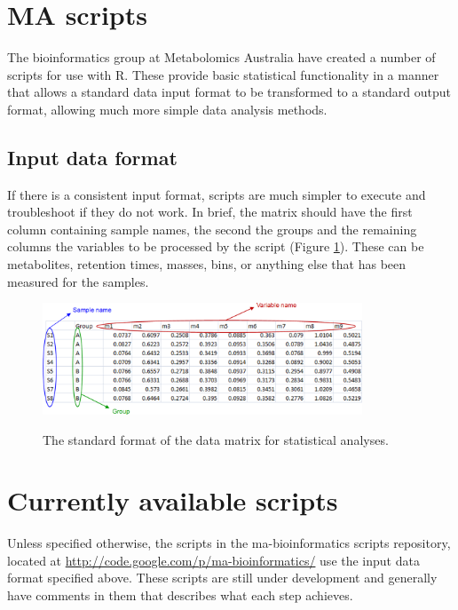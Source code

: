 \documentclass[english,a4paper,12pt]{article}
\begin{document}
\section*{MA scripts}
The bioinformatics group at Metabolomics Australia have created a number of scripts for use with R. These provide basic statistical functionality in a manner that allows a standard data input format to be transformed to a standard output format, allowing much more simple data analysis methods.

\subsection*{Input data format}
If there is a consistent input format, scripts are much simpler to execute and troubleshoot if they do not work. In brief, the matrix should have the first column containing sample names, the second the groups and the remaining columns the variables to be processed by the script (Figure \ref{fig:input_spec}). These can be metabolites, retention times, masses, bins, or anything else that has been measured for the samples.

\begin{figure}[h!tb]
\centering
\includegraphics[width=0.85\textwidth]{images/input_spec.png} \\
\caption[Input data format]{The standard format of the data matrix for statistical analyses.}
\label{fig:input_spec}
\end{figure}


\section*{Currently available scripts}
Unless specified otherwise, the scripts in the ma-bioinformatics scripts repository, located at \url{http://code.google.com/p/ma-bioinformatics/} use the input data format specified above. These scripts are still under development and generally have comments in them that describes what each step achieves.
\end{document}
